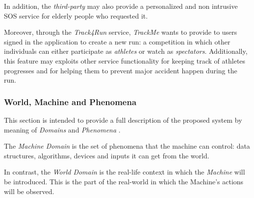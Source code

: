 \documentclass[a4paper]{article}
\begin{document}
        In addition, the \textit{third-party} may also provide a personalized and non intrusive SOS service for elderly people who requested it.
    
        Moreover, through the \textit{Track4Run} service, \textit{TrackMe} wants to provide to users signed in the application to create a new run: a competition in which other individuals can either participate as \textit{athletes} or watch as \textit{spectators}. Additionally, this feature may exploits other service functionality for keeping track of athletes progresses and for helping them to prevent major accident happen during the run.
        
        \subsubsection{World, Machine and Phenomena}
        
        This section is intended to provide a full description of the proposed system by meaning of \textit{Domains} and \textit{Phenomena} \cite{zave1997four}.
    
        The \textit{Machine Domain} is the set of phenomena that the machine can control: data structures, algorithms, devices and inputs it can get from the world.
        
        In contrast, the \textit{World Domain} is the real-life context in which the \textit{Machine} will be introduced. This is the part of the real-world in which the Machine’s actions will be observed.
        
\end{document}
